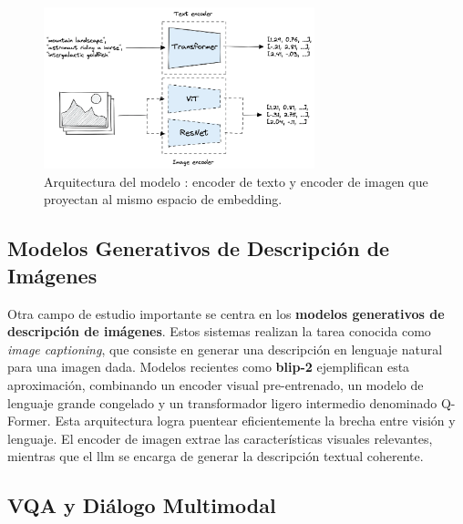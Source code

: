 \begin{figure}[h]
  \centering
  \includegraphics[width=0.7\textwidth]{archivos/clip_architecture.png}
  \caption[Arquitectura de CLIP]{Arquitectura del modelo : encoder de texto y encoder de imagen que proyectan al mismo espacio de embedding.}
  \label{fig:clip_architecture}
\end{figure}

\subsection{Modelos Generativos de Descripción de Imágenes}

Otra campo de estudio importante se centra en los \textbf{modelos generativos de descripción de imágenes}. Estos sistemas realizan la tarea conocida como \emph{image captioning}, que consiste en generar una descripción en lenguaje natural para una imagen dada. Modelos recientes como \textbf{\gls{blip}-2} ejemplifican esta aproximación, combinando un encoder visual pre-entrenado, un modelo de lenguaje grande congelado y un transformador ligero intermedio denominado Q-Former. Esta arquitectura logra puentear eficientemente la brecha entre visión y lenguaje. El encoder de imagen extrae las características visuales relevantes, mientras que el \gls{llm} se encarga de generar la descripción textual coherente.

\subsection{VQA y Diálogo Multimodal}

